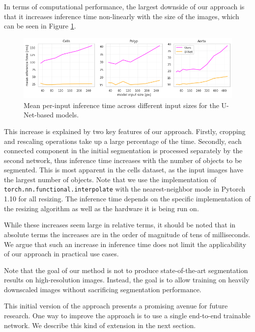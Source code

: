 In terms of computational performance, the largest downside of our approach is that it increases inference time non-linearly with the size of the images, which can be seen in Figure \ref{fig:inf-time}.

\begin{figure}[b!]
\centering
\includegraphics[width=\textwidth]{images/5/inf_time.png}
\caption{Mean per-input inference time across different input sizes for the U-Net-based models. \cite{bencevicSegmentthenSegmentContextPreservingCropBased2023a}\label{fig:inf-time}}
\end{figure}

This increase is explained by two key features of our approach. Firstly, cropping and rescaling operations take up a large percentage of the time. Secondly, each connected component in the initial segmentation is processed separately by the second network, thus inference time increases with the number of objects to be segmented. This is most apparent in the cells dataset, as the input images have the largest number of objects. Note that we use the implementation of \verb|torch.nn.functional.interpolate| with the nearest-neighbor mode in Pytorch 1.10 for all resizing. The inference time depends on the specific implementation of the resizing algorithm as well as the hardware it is being run on.

While these increases seem large in relative terms, it should be noted that in absolute terms the increases are in the order of magnitude of tens of milliseconds. We argue that such an increase in inference time does not limit the applicability of our approach in practical use cases.

Note that the goal of our method is not to produce state-of-the-art segmentation results on high-resolution images. Instead, the goal is to allow training on heavily downscaled images without sacrificing segmentation performance.

This initial version of the approach presents a promising avenue for future research. One way to improve the approach is to use a single end-to-end trainable network. We describe this kind of extension in the next section.

